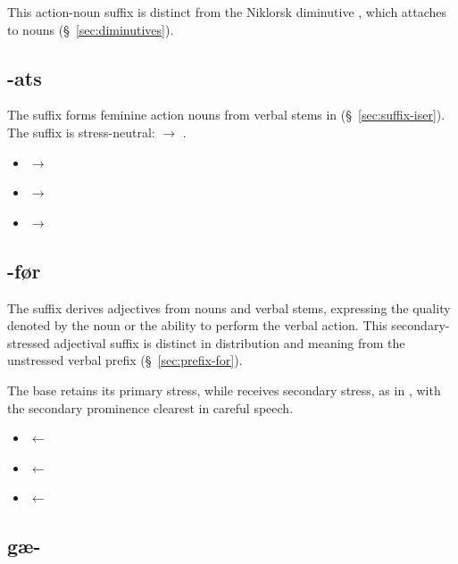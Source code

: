 This action-noun suffix is distinct from the Niklorsk diminutive , which attaches to nouns (\S~\ref{sec:diminutives}).

\subsection{-ats}

The suffix  forms feminine action nouns from verbal stems in  (\S~\ref{sec:suffix-iser}). The suffix is stress-neutral:  $\rightarrow$ .

\begin{itemize}
    \item {} $\rightarrow$ 
    \item {} $\rightarrow$ 
    \item {} $\rightarrow$ 
\end{itemize}

\subsection{-før}
\label{sec:suffix-for}

The suffix  derives adjectives from nouns and verbal stems, expressing the quality denoted by the noun or the ability to perform the verbal action. This secondary-stressed adjectival suffix is distinct in distribution and meaning from the unstressed verbal prefix  (\S~\ref{sec:prefix-for}).

The base retains its primary stress, while  receives secondary stress, as in , with the secondary prominence clearest in careful speech.

\begin{itemize}
    \item {} $\leftarrow$ 
    \item {} $\leftarrow$ 
    \item {} $\leftarrow$ 
\end{itemize}

\subsection{gæ-}
\label{sec:prefix-gae}

